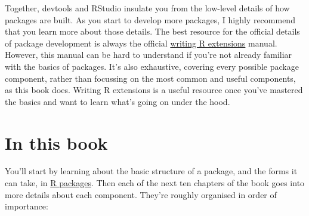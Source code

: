 \documentclass[]{book}
\begin{document}
Together, devtools and RStudio insulate you from the low-level details of how packages are built. As you start to develop more packages, I highly recommend that you learn more about those details. The best resource for the official details of package development is always the official \href{http://cran.r-project.org/doc/manuals/R-exts.html\#Creating-R-packages}{writing R extensions} manual. However, this manual can be hard to understand if you're not already familiar with the basics of packages. It's also exhaustive, covering every possible package component, rather than focussing on the most common and useful components, as this book does. Writing R extensions is a useful resource once you've mastered the basics and want to learn what's going on under the hood.

\hypertarget{intro-outline}{%
\section{In this book}\label{intro-outline}}

You'll start by learning about the basic structure of a package, and the forms it can take, in \protect\hyperlink{package-structure}{R packages}. Then each of the next ten chapters of the book goes into more details about each component. They're roughly organised in order of importance:
\end{document}
